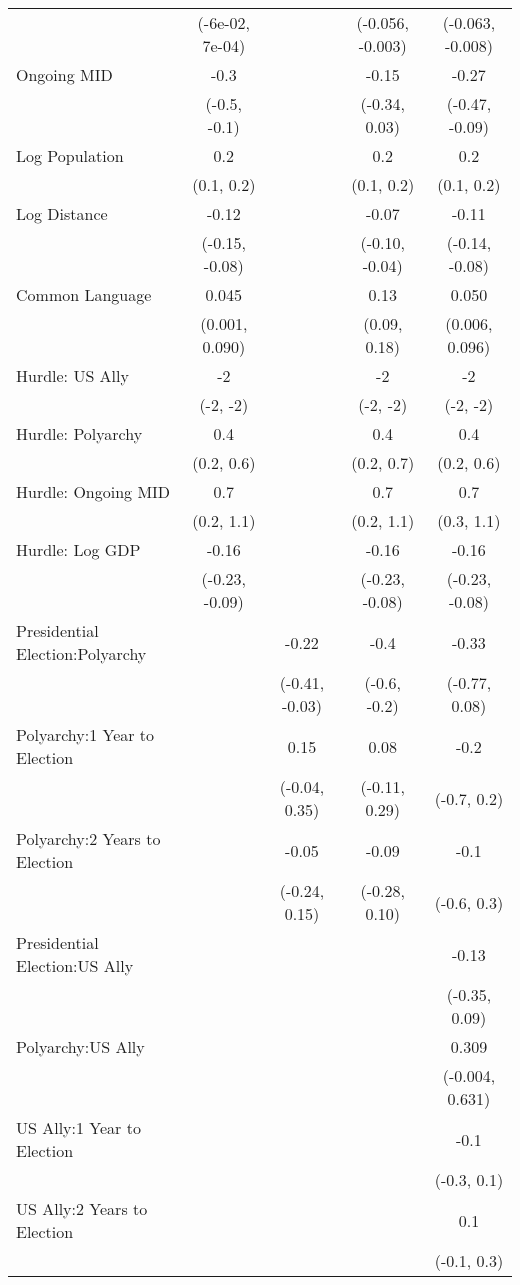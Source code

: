 \begin{table}[H]
{\begin{tabular}[t]{lcccc}
 & (-6e-02, 7e-04) &  & (-0.056, -0.003) & (-0.063, -0.008)\\
Ongoing MID & -0.3 &  & -0.15 & -0.27\\
 & (-0.5, -0.1) &  & (-0.34, 0.03) & (-0.47, -0.09)\\
Log Population & 0.2 &  & 0.2 & 0.2\\
 & (0.1, 0.2) &  & (0.1, 0.2) & (0.1, 0.2)\\
Log Distance & -0.12 &  & -0.07 & -0.11\\
 & (-0.15, -0.08) &  & (-0.10, -0.04) & (-0.14, -0.08)\\
Common Language & 0.045 &  & 0.13 & 0.050\\
 & (0.001, 0.090) &  & (0.09, 0.18) & (0.006, 0.096)\\
Hurdle: US Ally & -2 &  & -2 & -2\\
 & (-2, -2) &  & (-2, -2) & (-2, -2)\\
Hurdle: Polyarchy & 0.4 &  & 0.4 & 0.4\\
 & (0.2, 0.6) &  & (0.2, 0.7) & (0.2, 0.6)\\
Hurdle: Ongoing MID & 0.7 &  & 0.7 & 0.7\\
 & (0.2, 1.1) &  & (0.2, 1.1) & (0.3, 1.1)\\
Hurdle: Log GDP & -0.16 &  & -0.16 & -0.16\\
 & (-0.23, -0.09) &  & (-0.23, -0.08) & (-0.23, -0.08)\\
Presidential Election:Polyarchy &  & -0.22 & -0.4 & -0.33\\
 &  & (-0.41, -0.03) & (-0.6, -0.2) & (-0.77, 0.08)\\
Polyarchy:1 Year to Election &  & 0.15 & 0.08 & -0.2\\
 &  & (-0.04, 0.35) & (-0.11, 0.29) & (-0.7, 0.2)\\
Polyarchy:2 Years to Election &  & -0.05 & -0.09 & -0.1\\
 &  & (-0.24, 0.15) & (-0.28, 0.10) & (-0.6, 0.3)\\
Presidential Election:US Ally &  &  &  & -0.13\\
 &  &  &  & (-0.35, 0.09)\\
Polyarchy:US Ally &  &  &  & 0.309\\
 &  &  &  & (-0.004, 0.631)\\
US Ally:1 Year to Election &  &  &  & -0.1\\
 &  &  &  & (-0.3, 0.1)\\
US Ally:2 Years to Election &  &  &  & 0.1\\
 &  &  &  & (-0.1, 0.3)\\

\end{tabular}}
\end{table}
